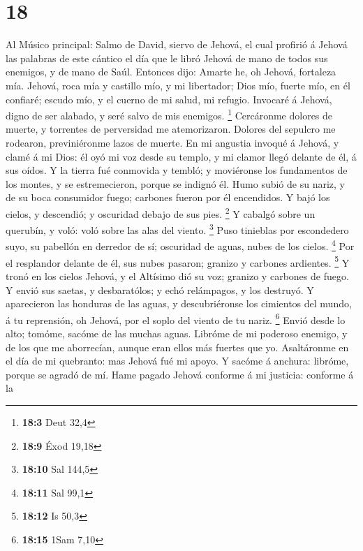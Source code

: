 \hypertarget{section-17}{%
\section{18}\label{section-17}}

 Al Músico principal: Salmo de David, siervo de Jehová, el
cual profirió á Jehová las palabras de este cántico el día que le libró
Jehová de mano de todos sus enemigos, y de mano de Saúl. Entonces dijo:
Amarte he, oh Jehová, fortaleza mía.  Jehová, roca mía y
castillo mío, y mi libertador; Dios mío, fuerte mío, en él confiaré;
escudo mío, y el cuerno de mi salud, mi refugio.  Invocaré á
Jehová, digno de ser alabado, y seré salvo de mis enemigos. \footnote{\textbf{18:3}
  Deut 32,4}  Cercáronme dolores de muerte, y torrentes de
perversidad me atemorizaron.  Dolores del sepulcro me
rodearon, previniéronme lazos de muerte.  En mi angustia
invoqué á Jehová, y clamé á mi Dios: él oyó mi voz desde su templo, y mi
clamor llegó delante de él, á sus oídos.  Y la tierra fué
conmovida y tembló; y moviéronse los fundamentos de los montes, y se
estremecieron, porque se indignó él.  Humo subió de su
nariz, y de su boca consumidor fuego; carbones fueron por él encendidos.
 Y bajó los cielos, y descendió; y oscuridad debajo de sus
pies. \footnote{\textbf{18:9} Éxod 19,18}  Y cabalgó sobre
un querubín, y voló: voló sobre las alas del viento. \footnote{\textbf{18:10}
  Sal 144,5}  Puso tinieblas por escondedero suyo, su
pabellón en derredor de sí; oscuridad de aguas, nubes de los cielos.
\footnote{\textbf{18:11} Sal 99,1}  Por el resplandor
delante de él, sus nubes pasaron; granizo y carbones ardientes.
\footnote{\textbf{18:12} Is 50,3}  Y tronó en los cielos
Jehová, y el Altísimo dió su voz; granizo y carbones de fuego.
 Y envió sus saetas, y desbaratólos; y echó relámpagos, y
los destruyó.  Y aparecieron las honduras de las aguas, y
descubriéronse los cimientos del mundo, á tu reprensión, oh Jehová, por
el soplo del viento de tu nariz. \footnote{\textbf{18:15} 1Sam 7,10}
 Envió desde lo alto; tomóme, sacóme de las muchas aguas.
 Libróme de mi poderoso enemigo, y de los que me
aborrecían, aunque eran ellos más fuertes que yo. 
Asaltáronme en el día de mi quebranto: mas Jehová fué mi apoyo.
 Y sacóme á anchura: libróme, porque se agradó de mí.
 Hame pagado Jehová conforme á mi justicia: conforme á la
